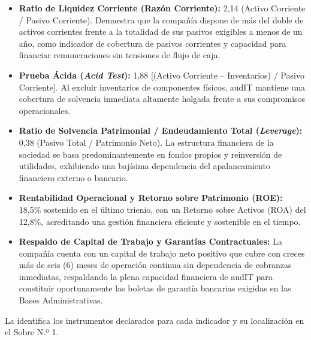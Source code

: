 \begin{itemize}
  \item \textbf{Ratio de Liquidez Corriente (Razón Corriente):} 2,14 (Activo Corriente / Pasivo Corriente). Demuestra que la compañía dispone de más del doble de activos corrientes frente a la totalidad de sus pasivos exigibles a menos de un año, como indicador de cobertura de pasivos corrientes y capacidad para financiar remuneraciones sin tensiones de flujo de caja.
  \item \textbf{Prueba Ácida (\textit{Acid Test}):} 1,88 [(Activo Corriente -- Inventarios) / Pasivo Corriente]. Al excluir inventarios de componentes físicos, audIT mantiene una cobertura de solvencia inmediata altamente holgada frente a sus compromisos operacionales.
  \item \textbf{Ratio de Solvencia Patrimonial / Endeudamiento Total (\textit{Leverage}):} 0,38 (Pasivo Total / Patrimonio Neto). La estructura financiera de la sociedad se basa predominantemente en fondos propios y reinversión de utilidades, exhibiendo una bajísima dependencia del apalancamiento financiero externo o bancario.
  \item \textbf{Rentabilidad Operacional y Retorno sobre Patrimonio (ROE):} 18,5\% sostenido en el último trienio, con un Retorno sobre Activos (ROA) del 12,8\%, acreditando una gestión financiera eficiente y sostenible en el tiempo.
  \item \textbf{Respaldo de Capital de Trabajo y Garantías Contractuales:} La compañía cuenta con un capital de trabajo neto positivo que cubre con creces más de seis (6) meses de operación continua sin dependencia de cobranzas inmediatas, respaldando la plena capacidad financiera de audIT para constituir oportunamente las boletas de garantía bancarias exigidas en las Bases Administrativas.
\end{itemize}

La  identifica los instrumentos declarados para cada indicador y su localización en el Sobre N.º 1.

